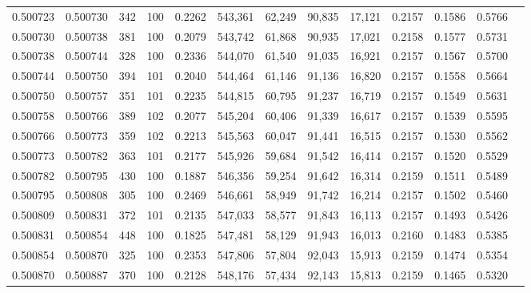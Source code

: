\begin{tabular}{rrrrrrrrrrrrr}
0.500723 & 0.500730 &   342 & 100 &                                     0.2262 & 543,361 &  62,249 &  90,835 &  17,121 & 0.2157 & 0.1586 & 0.5766 \\
0.500730 & 0.500738 &   381 & 100 &                                     0.2079 & 543,742 &  61,868 &  90,935 &  17,021 & 0.2158 & 0.1577 & 0.5731 \\
0.500738 & 0.500744 &   328 & 100 &                                     0.2336 & 544,070 &  61,540 &  91,035 &  16,921 & 0.2157 & 0.1567 & 0.5700 \\
0.500744 & 0.500750 &   394 & 101 &                                     0.2040 & 544,464 &  61,146 &  91,136 &  16,820 & 0.2157 & 0.1558 & 0.5664 \\
0.500750 & 0.500757 &   351 & 101 &                                     0.2235 & 544,815 &  60,795 &  91,237 &  16,719 & 0.2157 & 0.1549 & 0.5631 \\
0.500758 & 0.500766 &   389 & 102 &                                     0.2077 & 545,204 &  60,406 &  91,339 &  16,617 & 0.2157 & 0.1539 & 0.5595 \\
0.500766 & 0.500773 &   359 & 102 &                                     0.2213 & 545,563 &  60,047 &  91,441 &  16,515 & 0.2157 & 0.1530 & 0.5562 \\
0.500773 & 0.500782 &   363 & 101 &                                     0.2177 & 545,926 &  59,684 &  91,542 &  16,414 & 0.2157 & 0.1520 & 0.5529 \\
0.500782 & 0.500795 &   430 & 100 &                                     0.1887 & 546,356 &  59,254 &  91,642 &  16,314 & 0.2159 & 0.1511 & 0.5489 \\
0.500795 & 0.500808 &   305 & 100 &                                     0.2469 & 546,661 &  58,949 &  91,742 &  16,214 & 0.2157 & 0.1502 & 0.5460 \\
0.500809 & 0.500831 &   372 & 101 &                                     0.2135 & 547,033 &  58,577 &  91,843 &  16,113 & 0.2157 & 0.1493 & 0.5426 \\
0.500831 & 0.500854 &   448 & 100 &                                     0.1825 & 547,481 &  58,129 &  91,943 &  16,013 & 0.2160 & 0.1483 & 0.5385 \\
0.500854 & 0.500870 &   325 & 100 &                                     0.2353 & 547,806 &  57,804 &  92,043 &  15,913 & 0.2159 & 0.1474 & 0.5354 \\
0.500870 & 0.500887 &   370 & 100 &                                     0.2128 & 548,176 &  57,434 &  92,143 &  15,813 & 0.2159 & 0.1465 & 0.5320 \\

\end{tabular}
